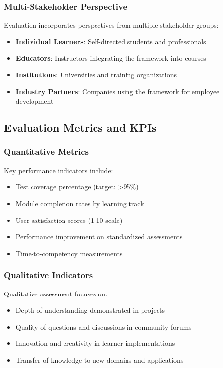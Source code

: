 \subsubsection{Multi-Stakeholder Perspective}

Evaluation incorporates perspectives from multiple stakeholder groups:

\begin{itemize}
    \item \textbf{Individual Learners}: Self-directed students and professionals
    \item \textbf{Educators}: Instructors integrating the framework into courses
    \item \textbf{Institutions}: Universities and training organizations
    \item \textbf{Industry Partners}: Companies using the framework for employee development
\end{itemize}

\subsection{Evaluation Metrics and KPIs}

\subsubsection{Quantitative Metrics}

Key performance indicators include:

\begin{itemize}
    \item Test coverage percentage (target: >95\%)
    \item Module completion rates by learning track
    \item User satisfaction scores (1-10 scale)
    \item Performance improvement on standardized assessments
    \item Time-to-competency measurements
\end{itemize}

\subsubsection{Qualitative Indicators}

Qualitative assessment focuses on:

\begin{itemize}
    \item Depth of understanding demonstrated in projects
    \item Quality of questions and discussions in community forums
    \item Innovation and creativity in learner implementations
    \item Transfer of knowledge to new domains and applications
\end{itemize}